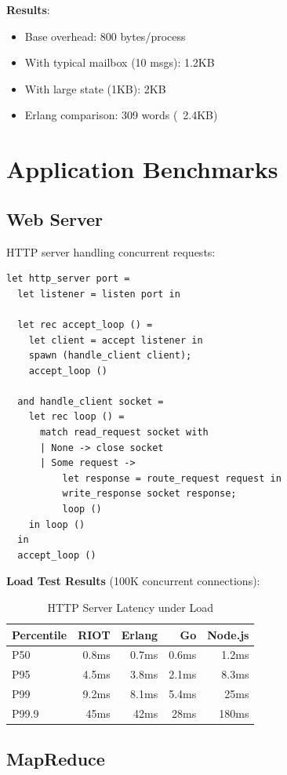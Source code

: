 \documentclass[12pt,a4paper]{report}
\begin{document}
\textbf{Results}:
\begin{itemize}
\item Base overhead: 800 bytes/process
\item With typical mailbox (10 msgs): 1.2KB
\item With large state (1KB): 2KB
\item Erlang comparison: 309 words (~2.4KB)
\end{itemize}

\section{Application Benchmarks}

\subsection{Web Server}

HTTP server handling concurrent requests:

\begin{lstlisting}
let http_server port =
  let listener = listen port in
  
  let rec accept_loop () =
    let client = accept listener in
    spawn (handle_client client);
    accept_loop ()
  
  and handle_client socket =
    let rec loop () =
      match read_request socket with
      | None -> close socket
      | Some request ->
          let response = route_request request in
          write_response socket response;
          loop ()
    in loop ()
  in
  accept_loop ()
\end{lstlisting}

\textbf{Load Test Results} (100K concurrent connections):

\begin{table}[h]
\centering
\begin{tabular}{|l|r|r|r|r|}
\hline
Percentile & RIOT & Erlang & Go & Node.js \\
\hline
P50 & 0.8ms & 0.7ms & 0.6ms & 1.2ms \\
P95 & 4.5ms & 3.8ms & 2.1ms & 8.3ms \\
P99 & 9.2ms & 8.1ms & 5.4ms & 25ms \\
P99.9 & 45ms & 42ms & 28ms & 180ms \\
\hline
\end{tabular}
\caption{HTTP Server Latency under Load}
\end{table}

\subsection{MapReduce}
\end{document}
